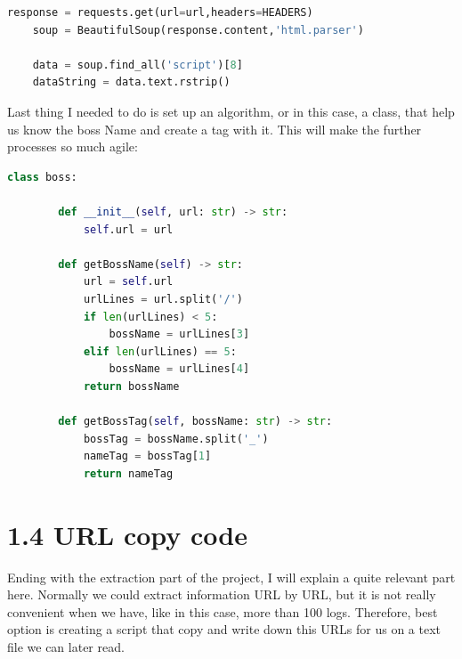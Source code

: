 \documentclass[12pt,a4paper]{article}
\begin{document}
    \begin{lstlisting}[language=Python]
    response = requests.get(url=url,headers=HEADERS)
    soup = BeautifulSoup(response.content,'html.parser')

    data = soup.find_all('script')[8]
    dataString = data.text.rstrip()
    \end{lstlisting}

    \newpage

    Last thing I needed to do is set up an algorithm, or in this case, a class, that help us know
    the boss Name and create a tag with it. This will make the further processes so much agile:

    \begin{lstlisting}[language=Python]
    class boss:

        def __init__(self, url: str) -> str:
            self.url = url

        def getBossName(self) -> str:
            url = self.url
            urlLines = url.split('/')
            if len(urlLines) < 5:
                bossName = urlLines[3]
            elif len(urlLines) == 5:
                bossName = urlLines[4]
            return bossName
        
        def getBossTag(self, bossName: str) -> str:
            bossTag = bossName.split('_')
            nameTag = bossTag[1]
            return nameTag
    \end{lstlisting}

    \section*{\large 1.4 URL copy code}
    Ending with the extraction part of the project, I will explain a quite relevant part here. 
    Normally we could extract information URL by URL, but it is not really convenient when we have, 
    like in this case, more than 100 logs. Therefore, best option is creating a script that copy and 
    write down this URLs for us on a text file we can later read.\\
\end{document}
